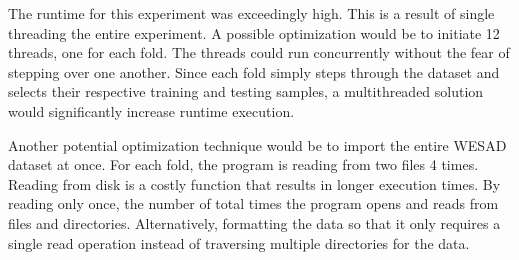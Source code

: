 The runtime for this experiment was exceedingly high. This is a result of single threading 
the entire experiment. A possible optimization would be to initiate 12 threads, one for 
each fold. The threads could run concurrently without the fear of stepping over one another. 
Since each fold simply steps through the dataset and selects their respective training and 
testing samples, a multithreaded solution would significantly increase runtime execution. 

Another potential optimization technique would be to import the entire WESAD dataset 
at once. For each fold, the program is reading from two files 4 times. Reading from disk 
is a costly function that results in longer execution times. By reading only once, the number 
of total times the program opens and reads from files and directories. Alternatively, 
formatting the data so that it only requires a single read operation instead of traversing 
multiple directories for the data.